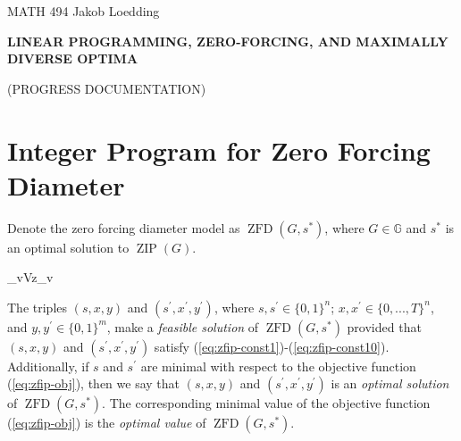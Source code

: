 \documentclass{article}
\newcommand\zip[1]{\operatorname{ZIP}\left(#1\right)}
\newcommand\zfd[1]{\operatorname{ZFD}\left(#1\right)}
\theoremstyle{definition}
\begin{document}
\noindent
{MATH 494}
\hfill
{
Jakob Loedding}

\vspace{.3 in}

\centerline{\large \bf  L{\small INEAR} P{\small ROGRAMMING,} Z{\small ERO-}F{\small ORCING,} {\small AND} M{\small AXIMALLY} D{\small IVERSE} O{\small PTIMA} }
\vspace{.1 in}
\centerline{\large  (P{\small ROGRESS} D{\small OCUMENTATION})}

\vspace{.2 in}

\section{Integer Program for Zero Forcing Diameter}\label{sec:intprog}
Denote the zero forcing diameter model as $\zfd{G,s^{*}}$, where $G \in \mathbb{G}$ and $s^{*}$ is an optimal solution to $\zip{G}$.

\begin{mini!}
	{}{\sum_{v\in V}z_{v}}{}{}\label{eq:zfip-obj}
	\label{eq:zfip-const1}
	\label{eq:zfip-const2}
	\label{eq:zfip-const3}
	\label{eq:zfip-const4}
	\label{eq:zfip-const5}
	\label{eq:zfip-const6}
	\label{eq:zfip-const7}
	\label{eq:zfip-const8}
	\label{eq:zfip-const9}
	\label{eq:zfip-const10}
\end{mini!} 
The triples $(s,x,y)$ and $(s^{'},x^{'},y^{'})$, where $s,s^{'} \in \{0,1\}^{n}$; $x,x^{'} \in \{0,...,T\}^{n}$, and $y,y^{'} \in \{0,1\}^{m}$, make a  \textit{feasible solution} of $\zfd{G,s^{*}}$ provided that $(s,x,y)$ and $(s^{'},x^{'},y^{'})$ satisfy (\ref{eq:zfip-const1})-(\ref{eq:zfip-const10}).
Additionally, if $s$ and $s^{'}$ are minimal with respect to the objective function (\ref{eq:zfip-obj}), then we say that $(s,x,y)$ and $(s^{'},x^{'},y^{'})$ is an \textit{optimal solution} of $\zfd{G,s^{*}}$.
The corresponding minimal value of the objective function (\ref{eq:zfip-obj}) is the \textit{optimal value} of $\zfd{G,s^{*}}$.
\end{document}
